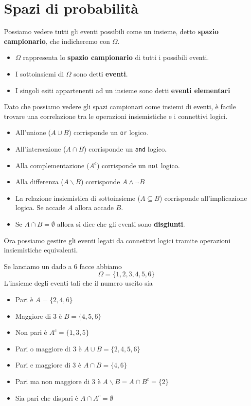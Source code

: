 \section{Spazi di probabilità}
Possiamo vedere tutti gli eventi possibili come un insieme, detto \textbf{spazio campionario}, che
indicheremo con $\Omega$.
\begin{itemize}
	\item $\Omega$ rappresenta lo \textbf{spazio campionario} di tutti i possibili eventi.
	\item I sottoinsiemi di $\Omega$ sono detti \textbf{eventi}.
	\item I singoli esiti appartenenti ad un insieme sono detti \textbf{eventi elementari}
\end{itemize}
Dato che possiamo vedere gli spazi campionari come insiemi di eventi, è facile trovare una 
correlazione tra le operazioni insiemistiche e i connettivi logici.
\begin{itemize}
	\item All'unione ($A \cup B$) corrisponde un \verb|or| logico.
	\item All'intersezione ($A \cap B$) corrisponde un \verb|and| logico.
	\item Alla complementazione ($A^c$) corrisponde un \verb|not| logico.
	\item Alla differenza ($A \backslash B$) corrisponde $A \land \lnot B$
	\item La relazione insiemistica di sottoinsieme ($A \subseteq B$) corrisponde 
		all'implicazione logica. Se accade $A$ allora accade $B$.
	\item Se $A \cap B = \emptyset$ allora si dice che gli eventi sono \textbf{disgiunti}.
\end{itemize}
Ora possiamo gestire gli eventi legati da connettivi logici tramite operazioni insiemistiche
equivalenti.

\begin{example}
	Se lanciamo un dado a 6 facce abbiamo
	\[ \Omega = \{ 1, 2, 3, 4, 5, 6 \} \]
	L'insieme degli eventi tali che il numero uscito sia
	\begin{itemize}
		\item Pari è $A = \{ 2, 4, 6 \}$
		\item Maggiore di 3 è $B = \{ 4, 5, 6 \}$
		\item Non pari è $A^c = \{ 1, 3, 5 \}$
		\item Pari o maggiore di 3 è $A \cup B = \{ 2, 4, 5, 6 \}$
		\item Pari e maggiore di 3 è $A \cap B = \{ 4, 6 \}$
		\item Pari ma non maggiore di 3 è $A \backslash B = A \cap B^c = \{2\}$
		\item Sia pari che dispari è $A \cap A^c = \emptyset$
	\end{itemize}
\end{example}

